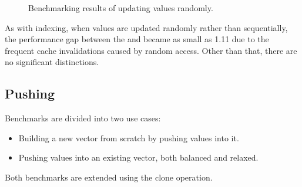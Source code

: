 \begin{figure}[!htbp]
    \caption{Benchmarking results of updating values randomly.}
    \label{fig:update-randomly}
\end{figure}

As with indexing, when values are updated randomly rather than sequentially, the performance gap between the \stdvec{} and \pvec{} became as small as 1.11 due to the frequent cache invalidations caused by random access. Other than that, there are no significant distinctions.

\subsection{Pushing}
Benchmarks are divided into two use cases:
\begin{itemize}
    \item Building a new vector from scratch by pushing values into it.
    \item Pushing values into an existing vector, both balanced and relaxed.
\end{itemize}

Both benchmarks are extended using the clone operation.

